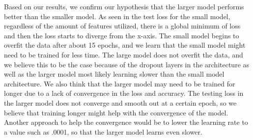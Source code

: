 \documentclass{article}
\begin{document}
Based on our results, we confirm our hypothesis that the larger model performs better than the smaller model. As seen in the test loss for the small model, regardless of the amount of features utilized, there is a global minimum of loss and then the loss starts to diverge from the x-axis. The small model begins to overfit the data after about 15 epochs, and we learn that the small model might need to be trained for less time. The large model does not overfit the data, and we believe this to be the case because of the dropout layers in the architecture as well as the larger model most likely learning slower than the small model architecture. We also think that the larger model may need to be trained for longer due to a lack of convergence in the loss and accuracy. The testing loss in the larger model does not converge and smooth out at a certain epoch, so we believe that training longer might help with the convergence of the model. Another approach to help the convergence would be to lower the learning rate to a value such as .0001, so that the larger model learns even slower.
\end{document}
